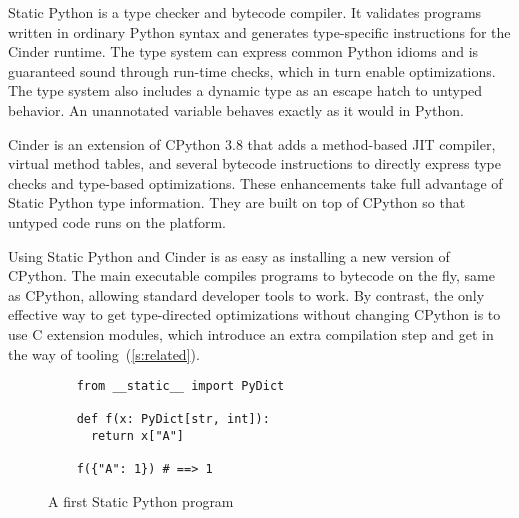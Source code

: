 \documentclass[english,cleveref,submission]{programming}
\newcommand{\SP}{Static Python}
\begin{document}
\SP{} is a type checker and bytecode compiler.
It validates programs written in ordinary Python syntax
and generates type-specific instructions for the Cinder runtime.
The type system can express common Python idioms and is guaranteed
sound through run-time checks, which in turn enable optimizations.
The type system also includes a dynamic type as an escape hatch to
untyped behavior.
An unannotated variable behaves exactly as it would in Python.

Cinder is an extension of CPython 3.8 that adds a method-based
JIT compiler, virtual method tables, and several bytecode instructions
to directly express type checks and type-based optimizations.
These enhancements take full advantage of \SP{} type information.
They are built on top of CPython so that untyped code runs on
the platform.

Using \SP{} and Cinder is as easy as installing a new version
of CPython.
The main executable compiles programs to bytecode on the fly,
same as CPython, allowing standard developer tools to work.
By contrast, the only effective way to get type-directed optimizations
without changing CPython is to use C extension modules,
which introduce an extra compilation step and get in the way
of tooling~(\cref{s:related}).

\begin{figure}
  \begin{verbatim}
    from __static__ import PyDict

    def f(x: PyDict[str, int]):
      return x["A"]

    f({"A": 1}) # ==> 1
  \end{verbatim}
%
%
%
%
  \caption{A first \SP{} program}
  \label{fig:sp-example}
\end{figure}
\end{document}
